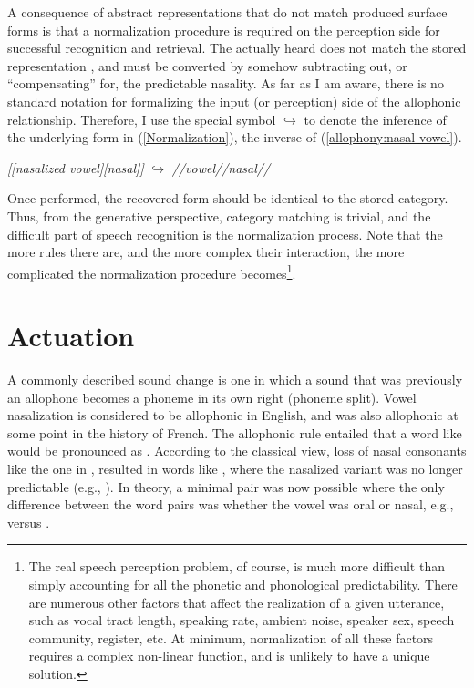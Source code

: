 A consequence of abstract representations that do not match produced
surface forms is that a normalization procedure is required on the
perception side for successful recognition and retrieval. The actually
heard \textipa{[læ̃m]} does not match the stored representation
, and must be converted by somehow subtracting out,
or “compensating” for, the predictable nasality. As far as I
am aware, there is no standard notation for formalizing the input
(or perception) side of the allophonic relationship. Therefore, I
use the special symbol $\hookrightarrow$ to denote the inference
of the underlying form in (\ref{Normalization}), the inverse of (\ref{allophony:nasal vowel}). 
\begin{covexamples}
\item \label{Normalization} \emph{{[}{[}nasalized vowel{]}{[}nasal{]}{]}}
$\hookrightarrow$ \emph{//vowel//nasal//}
\end{covexamples}
Once performed, the recovered form should be identical to the stored
category. Thus, from the generative perspective, category matching
is trivial, and the difficult part of speech recognition is the normalization
process. Note that the more rules there are, and the more complex
their interaction, the more complicated the normalization procedure
becomes\footnote{The real speech perception problem, of course, is much more difficult
than simply accounting for all the phonetic and phonological predictability.
There are numerous other factors that affect the realization of a
given utterance, such as vocal tract length, speaking rate, ambient
noise, speaker sex, speech community, register, etc. At minimum, normalization
of all these factors requires a complex non-linear function, and is
unlikely to have a unique solution. }. 

\section{\label{sec:Actuation-1}Actuation }

A commonly described sound change is one in which a sound that was
previously an allophone becomes a phoneme in its own right (phoneme
split). Vowel nasalization is considered to be allophonic in English,
and was also allophonic at some point in the history of French. The
allophonic rule entailed that a word like  would be
pronounced as \textipa{[bɔ̃n]}. According to the classical view,
loss of nasal consonants like the one in \textipa{[bɔ̃n]}, resulted
in words like \textipa{[bɔ̃]}, where the nasalized variant was
no longer predictable (e.g., \citealt{Hajek1997a}). In theory, a
minimal pair was now possible where the only difference between the
word pairs was whether the vowel was oral or nasal, e.g., \textipa{[bɔ̃]}
versus \textipa{[bO]}. 

